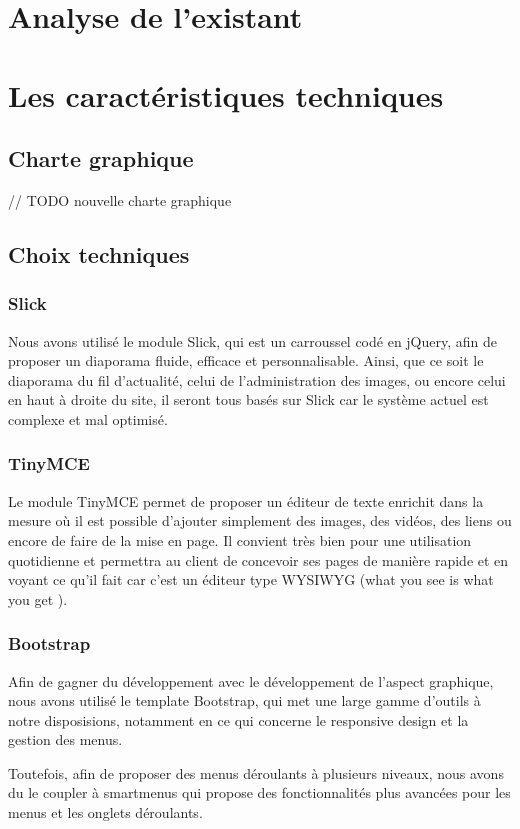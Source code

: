 \documentclass[11pt]{report}
\begin{document}
\chapter{Analyse de l'existant}

\chapter{Les caractéristiques techniques}
\section{Charte graphique}
// TODO nouvelle charte graphique
\section{Choix techniques}
\subsection{Slick}
Nous avons utilisé le module Slick, qui est un carroussel codé en jQuery, afin
de proposer un diaporama fluide, efficace et personnalisable. Ainsi, que ce soit
le diaporama du fil d'actualité, celui de l'administration des images, ou encore
celui en haut à droite du site, il seront tous basés sur Slick car le système
actuel est complexe et mal optimisé.

\subsection{TinyMCE}
Le module TinyMCE permet de proposer un éditeur de texte enrichit dans la mesure
où il est possible d'ajouter simplement des images, des vidéos, des liens ou
encore de faire de la mise en page. Il convient très bien pour une utilisation
quotidienne et permettra au client de concevoir ses pages de manière rapide et
en voyant ce qu'il fait car c'est un éditeur type \og WYSIWYG \fg{} (\og what you
see is what you get \fg{}).

\subsection{Bootstrap}
Afin de gagner du développement avec le développement de l'aspect graphique,
nous avons utilisé le template Bootstrap, qui met une large gamme d'outils à
notre disposisions, notamment en ce qui concerne le responsive design et la
gestion des menus. \\
\par Toutefois, afin de proposer des menus déroulants à plusieurs niveaux, nous
avons du le coupler à \og smartmenus \fg{} qui propose des fonctionnalités plus
avancées pour les menus et les onglets déroulants.
\end{document}
